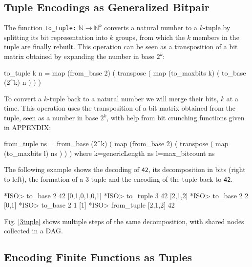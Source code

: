 \documentclass[]{INCLUDES/llncs}
\begin{document}
\subsection{Tuple Encodings as Generalized Bitpair} \label{tuple}
The function {\tt to\_tuple:} $\mathbb{N} \rightarrow \mathbb{N}^k$ converts a natural 
number to a $k$-tuple by splitting its bit representation into $k$ groups, 
from which the $k$ members in the tuple are finally rebuilt. This operation 
can be seen as a transposition of a bit matrix obtained by expanding 
the number in base $2^k$:
\begin{code}  
to_tuple k n = map (from_base 2) (
    transpose (
      map (to_maxbits k) (
        to_base (2^k) n
      )
    )
  )
\end{code}
To convert a $k$-tuple back to a natural number we will merge their 
bits, $k$ at a time. This operation uses the transposition of a bit 
matrix obtained from the tuple, seen as a number in base $2^k$, 
with help from bit crunching functions given in APPENDIX:
\begin{code}
from_tuple ns = from_base (2^k) (
    map (from_base 2) (
      transpose (
        map (to_maxbits l) ns
      )
    )
  ) where 
      k=genericLength ns
      l=max_bitcount ns
\end{code}
The following example shows the decoding of {\tt 42}, its decomposition 
in bits (right to left), the formation of a $3$-tuple and the encoding 
of the tuple back to {\tt 42}.
\begin{codex}
*ISO> to_base 2 42
[0,1,0,1,0,1]
*ISO> to_tuple 3 42
[2,1,2]
*ISO> to_base 2 2
[0,1]
*ISO> to_base 2 1
[1]
*ISO> from_tuple [2,1,2]
42
\end{codex}
Fig. \ref{3tuple} shows multiple steps of the same decomposition, 
with shared nodes collected in a DAG. 

\subsection{Encoding Finite Functions as Tuples}
\end{document}
